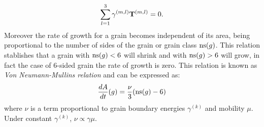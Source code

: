 \begin{equation}
    \sum_{l=1}^{3}\gamma^{(m,l)}\mathbf{T}^{(m,l)} = 0.
\end{equation}
Moreover the rate of growth for a grain becomes independent of its area, being proportional to the number of sides of the grain or grain class $\operatorname{ns}(g)$. This relation stablishes that a grain with $\operatorname{ns}(g) < 6$ will shrink and with $\operatorname{ns}(g) > 6$ will grow, in fact the case of 6-sided grain the rate of growth is zero. This relation is known as \emph{Von Neumann-Mullins relation} \cite{mullins1956two} and can be expressed as:
\begin{equation}
    \frac{dA}{dt}(g) = \frac{\nu}{3}(\operatorname{ns}(g)-6)
    \label{eq:vonneumann-mullins}
\end{equation}
where $\nu$ is a term proportional to grain boundary energies $\gamma^{(k)}$ and mobility $\mu$. Under constant $\gamma^{(k)}$, $\nu \propto \gamma \mu$.


